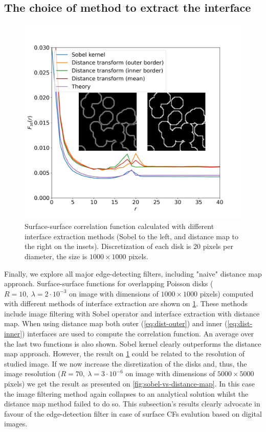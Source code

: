 \documentclass[reprint,amsmath,amssymb,aps,pre,showkeys,showpacs]{revtex4-1}
\begin{document}
\subsection{The choice of method to extract the interface}
\begin{figure}[ht]
  \centering
  \includegraphics[width=\linewidth]{images/dm_sobel.png}
  \caption{Surface-surface correlation function calculated with different
    interface extraction methods (Sobel to the left, and distance map to the
    right on the insets). Discretization of each disk is 20 pixels per diameter,
    the size is $1000 \times 1000$ pixels.}
  \label{fig:interface-extraction}
\end{figure}

Finally, we explore all major edge-detecting filters, including "naive" distance
map approach. Surface-surface functions for overlapping Poisson disks
($R = 10,\ \lambda = 2 \cdot 10^{-3}$ on image with dimensions of $1000 \times 1000$
pixels) computed with different methods of interface extraction are shown on
\cref{fig:interface-extraction}. These methods include image filtering with
Sobel operator and interface extraction with distance map. When using distance
map both outer (\cref{eq:dist-outer}) and inner (\cref{eq:dist-inner})
interfaces are used to compute the correlation function. An average over the
last two functions is also shown. Sobel kernel clearly outperforms the distance
map approach. However, the result on \cref{fig:interface-extraction} could be
related to the resolution of studied image. If we now increase the disretization
of the disks and, thus, the image resolution
($R = 70,\ \lambda = 3 \cdot 10^{-6}$ on image with dimensions of
$5000 \times 5000$ pixels) we get the result as presented on
\cref{fig:sobel-vs-distance-map}. In this case the image filtering method again
collapses to an analytical solution whilst the distance map method failed to do
so. This subsection's results clearly advocate in favour of the edge-detection
filter in case of surface CFs evalution based on digital images.
\end{document}
